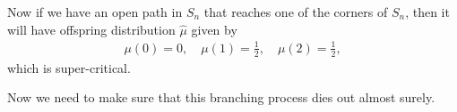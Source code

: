 \documentclass{article}
\theoremstyle{definition}
\newcommand{\1}{\mathbbm{1}}
\newcommand{\0}{\mathbf{o}}
\begin{document}
Now if we have an open path in $S_n$ that reaches one of the corners of $S_n$, then it will have offspring distribution $\hat{\mu}$ given by 
\begin{align*}
    \mu(0) = 0, \quad \mu(1) = \frac{1}{2}, \quad \mu(2) = \frac{1}{2},
\end{align*}
which is super-critical. 

Now we need to make sure that this branching process dies out almost surely. 
\end{document}
